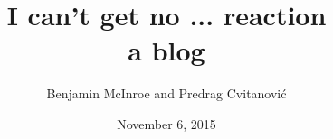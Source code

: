 \documentclass[10pt,openany]{book}
\begin{document}
        \date{November 6, 2015} \Private{\date{\today}}

\title{ 			I can't get no ... reaction
       \\ \Huge 	a blog
        \\\vspace{1.0cm}
        }\author{
		Benjamin McInroe
         and
        Predrag Cvitanovi\'{c}
        }

%
\maketitle

\thispagestyle{empty}
\tableofcontents


\newpage



\end{document}
